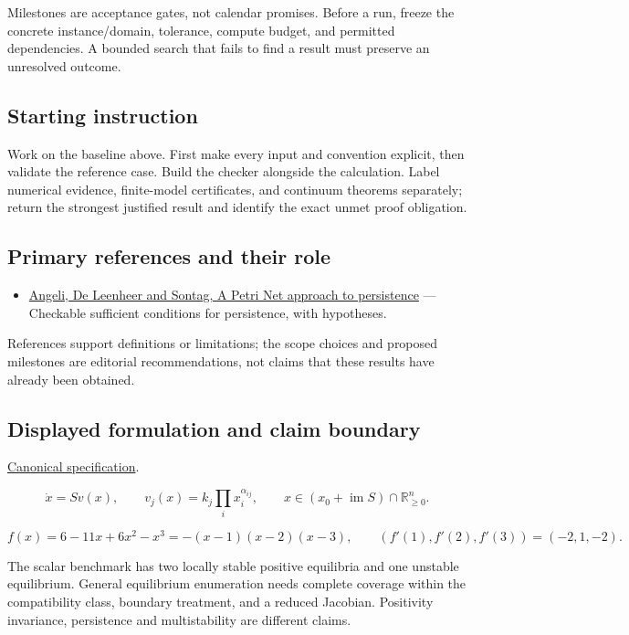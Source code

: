 \documentclass[
  11pt,
]{article}
\providecommand{\tightlist}{%
  \setlength{\itemsep}{0pt}\setlength{\parskip}{0pt}}
\begin{document}
Milestones are acceptance gates, not calendar promises. Before a run,
freeze the concrete instance/domain, tolerance, compute budget, and
permitted dependencies. A bounded search that fails to find a result
must preserve an unresolved outcome.

\subsection{Starting instruction}

Work on the baseline above. First make every input and convention
explicit, then validate the reference case. Build the checker alongside
the calculation. Label numerical evidence, finite-model certificates,
and continuum theorems separately; return the strongest justified result
and identify the exact unmet proof obligation.

\subsection{Primary references and their role}

\begin{itemize}
\tightlist
\item
  \href{https://arxiv.org/abs/q-bio/0608019}{Angeli, De Leenheer and
  Sontag, A Petri Net approach to persistence} --- Checkable sufficient
  conditions for persistence, with hypotheses.
\end{itemize}

References support definitions or limitations; the scope choices and
proposed milestones are editorial recommendations, not claims that these
results have already been obtained.

\subsection{Displayed formulation and claim boundary}

\href{https://github.com/rick-stevens-ai/Pure-Thought/blob/main/PRDs/19-Chemical-Reaction-Networks.md}{Canonical
specification}.

\[\dot x=S v(x),\qquad v_j(x)=k_j\prod_i x_i^{\alpha_{ij}},\qquad
x\in(x_0+\operatorname{im}S)\cap\mathbb R_{\ge0}^n.\]

\[f(x)=6-11x+6x^2-x^3=-(x-1)(x-2)(x-3),
\qquad (f'(1),f'(2),f'(3))=(-2,1,-2).\]

The scalar benchmark has two locally stable positive equilibria and one
unstable equilibrium. General equilibrium enumeration needs complete
coverage within the compatibility class, boundary treatment, and a
reduced Jacobian. Positivity invariance, persistence and multistability
are different claims.
\end{document}
